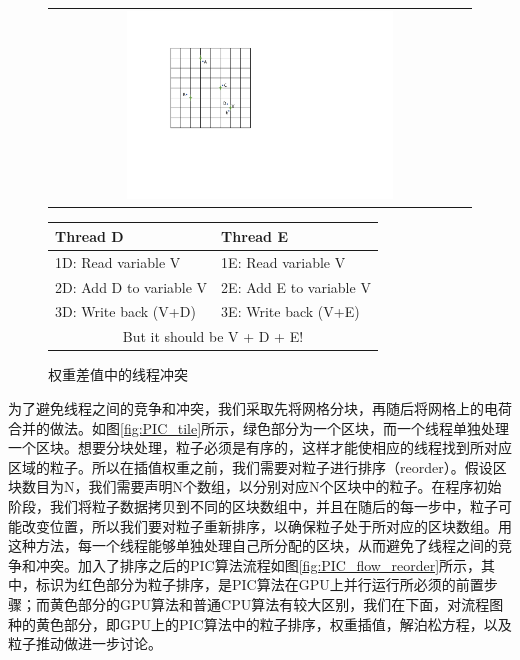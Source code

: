 \begin{figure}[!htb]
  \centering
  \begin{tabular}{|l|l|}
    \multicolumn{2}{c}{
    \includegraphics[width=0.65\textwidth]{Img/3PIC_weighting.pdf}} \\
  \end{tabular}
  \begin{tabular}{|l|l|}
    \hline
    Thread D & Thread E  \\
    \hline
    1D: Read variable V     & 1E: Read variable V     \\
    2D: Add D to variable V & 2E: Add E to variable V \\
    3D: Write back (V+D)    & 3E: Write back (V+E)    \\
    \hline
    \multicolumn{2}{c}{But it should be V + D + E!}
  \end{tabular}
  \caption{权重差值中的线程冲突}
  \label{fig:PIC_weighting}
\end{figure}

为了避免线程之间的竞争和冲突，我们采取先将网格分块，再随后将网格上的电荷合并的做法。如图\ref{fig:PIC_tile}所示，绿色部分为一个区块，而一个线程单独处理一个区块。想要分块处理，粒子必须是有序的，这样才能使相应的线程找到所对应区域的粒子。所以在插值权重之前，我们需要对粒子进行排序（reorder）。假设区块数目为N，我们需要声明N个数组，以分别对应N个区块中的粒子。在程序初始阶段，我们将粒子数据拷贝到不同的区块数组中，并且在随后的每一步中，粒子可能改变位置，所以我们要对粒子重新排序，以确保粒子处于所对应的区块数组。用这种方法，每一个线程能够单独处理自己所分配的区块，从而避免了线程之间的竞争和冲突。加入了排序之后的PIC算法流程如图\ref{fig:PIC_flow_reorder}所示，其中，标识为红色部分为粒子排序，是PIC算法在GPU上并行运行所必须的前置步骤；而黄色部分的GPU算法和普通CPU算法有较大区别，我们在下面，对流程图种的黄色部分，即GPU上的PIC算法中的粒子排序，权重插值，解泊松方程，以及粒子推动做进一步讨论。

